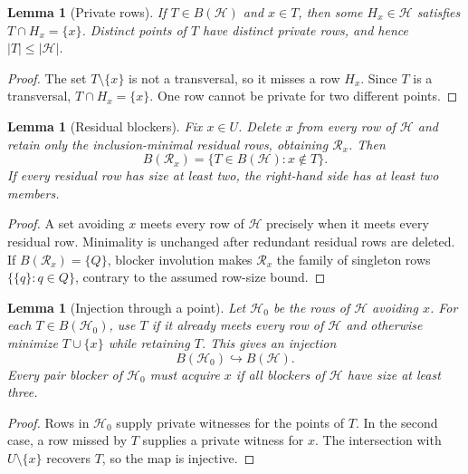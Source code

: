 \documentclass[11pt,a4paper]{article}
\newtheorem{lemma}[theorem]{Lemma}
\theoremstyle{definition}
\newcommand{\blocker}{B}
\begin{document}
\begin{lemma}[Private rows]
\label{lem:private}
If $T\in\blocker(\mathcal H)$ and $x\in T$, then some
$H_x\in\mathcal H$ satisfies $T\cap H_x=\{x\}$.  Distinct points of $T$
have distinct private rows, and hence $|T|\leq|\mathcal H|$.
\end{lemma}

\begin{proof}
The set $T\setminus\{x\}$ is not a transversal, so it misses a row $H_x$.
Since $T$ is a transversal, $T\cap H_x=\{x\}$.  One row cannot be private
for two different points.
\end{proof}

\begin{lemma}[Residual blockers]
\label{lem:residual}
Fix $x\in U$.  Delete $x$ from every row of $\mathcal H$ and retain only
the inclusion-minimal residual rows, obtaining $\mathcal R_x$.  Then
\[
  \blocker(\mathcal R_x)
  =\{T\in\blocker(\mathcal H):x\notin T\}.
\]
If every residual row has size at least two, the right-hand side has at least
two members.
\end{lemma}

\begin{proof}
A set avoiding $x$ meets every row of $\mathcal H$ precisely when it meets
every residual row.  Minimality is unchanged after redundant residual rows
are deleted.  If $\blocker(\mathcal R_x)=\{Q\}$, blocker involution makes
$\mathcal R_x$ the family of singleton rows $\{\{q\}:q\in Q\}$, contrary
to the assumed row-size bound.
\end{proof}

\begin{lemma}[Injection through a point]
\label{lem:injection}
Let $\mathcal H_0$ be the rows of $\mathcal H$ avoiding $x$.  For each
$T\in\blocker(\mathcal H_0)$, use $T$ if it already meets every row of
$\mathcal H$ and otherwise minimize $T\cup\{x\}$ while retaining $T$.
This gives an injection
\[
  \blocker(\mathcal H_0)\hookrightarrow\blocker(\mathcal H).
\]
Every pair blocker of $\mathcal H_0$ must acquire $x$ if all blockers of
$\mathcal H$ have size at least three.
\end{lemma}

\begin{proof}
Rows in $\mathcal H_0$ supply private witnesses for the points of $T$.  In
the second case, a row missed by $T$ supplies a private witness for $x$.
The intersection with $U\setminus\{x\}$ recovers $T$, so the map is
injective.
\end{proof}
\end{document}
